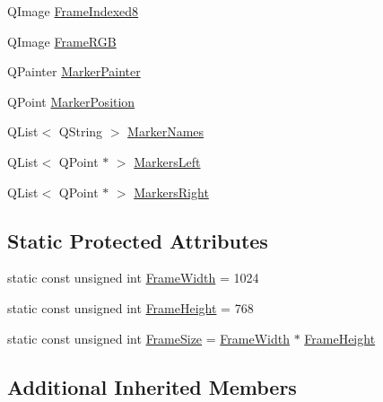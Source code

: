 \begin{DoxyCompactItemize}
\begin{tabbing}
\end{tabbing}\item 
Q\-Image \hyperlink{classmts_micron_tracker_controller_qt_component_a5a49408aaca6767730195a7f6e6ee859}{Frame\-Indexed8}
\item 
Q\-Image \hyperlink{classmts_micron_tracker_controller_qt_component_a2bcd03bf9c1a7a3ce4f6339bd4f8928e}{Frame\-R\-G\-B}
\item 
Q\-Painter \hyperlink{classmts_micron_tracker_controller_qt_component_ac80c41545a6b9c5a633fef5f6c5b8c9b}{Marker\-Painter}
\item 
Q\-Point \hyperlink{classmts_micron_tracker_controller_qt_component_a841a943c376a4f657a680c3c1ebeef40}{Marker\-Position}
\item 
Q\-List$<$ Q\-String $>$ \hyperlink{classmts_micron_tracker_controller_qt_component_a9c2fe3fd9ddc39de26a8a0047571cf5d}{Marker\-Names}
\item 
Q\-List$<$ Q\-Point $\ast$ $>$ \hyperlink{classmts_micron_tracker_controller_qt_component_a933dd8ff3d631665e825a30bf9ad8140}{Markers\-Left}
\item 
Q\-List$<$ Q\-Point $\ast$ $>$ \hyperlink{classmts_micron_tracker_controller_qt_component_ac2481b44f1f9f09fc9ea04b9d996279a}{Markers\-Right}
\end{DoxyCompactItemize}
\subsection*{Static Protected Attributes}
\begin{DoxyCompactItemize}
\item 
static const unsigned int \hyperlink{classmts_micron_tracker_controller_qt_component_a21d605763b597bc0aac16ccd81da7efe}{Frame\-Width} = 1024
\item 
static const unsigned int \hyperlink{classmts_micron_tracker_controller_qt_component_a42e61d9abf3d47a2429dd76448ff6fae}{Frame\-Height} = 768
\item 
static const unsigned int \hyperlink{classmts_micron_tracker_controller_qt_component_aef12d46a73222fb1ab376af7f0c71abb}{Frame\-Size} = \hyperlink{classmts_micron_tracker_controller_qt_component_a21d605763b597bc0aac16ccd81da7efe}{Frame\-Width} $\ast$ \hyperlink{classmts_micron_tracker_controller_qt_component_a42e61d9abf3d47a2429dd76448ff6fae}{Frame\-Height}
\end{DoxyCompactItemize}
\subsection*{Additional Inherited Members}


